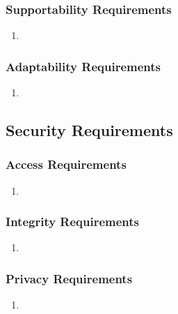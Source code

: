 \documentclass[]{article}
\begin{document}
\subsubsection{Supportability Requirements}
\label{ssub:supportability_requirements}
\begin{enumerate}[{MS-S}1. ]
	\item 
\end{enumerate}

\subsubsection{Adaptability Requirements}
\label{ssub:adaptability_requirements}
\begin{enumerate}[{MS-A}1. ]
	\item 
\end{enumerate}


\subsection{Security Requirements}
\label{sub:security_requirements}

\subsubsection{Access Requirements}
\label{ssub:access_requirements}
\begin{enumerate}[{SR-AC}1. ]
	\item 
\end{enumerate}

\subsubsection{Integrity Requirements}
\label{ssub:integrity_requirements}
\begin{enumerate}[{SR-INT}1. ]
	\item 
\end{enumerate}

\subsubsection{Privacy Requirements}
\label{ssub:privacy_requirements}
\begin{enumerate}[{SR-P}1. ]
	\item 
\end{enumerate}
\end{document}
